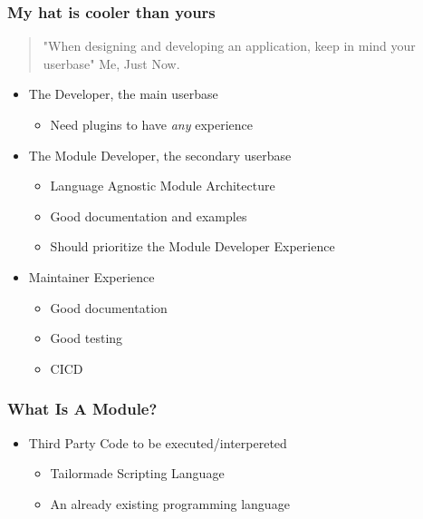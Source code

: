 \documentclass{beamer}
\begin{document}
\begin{frame}
  \frametitle{My hat is cooler than yours }
  \begin{quote}
    "When designing and developing an application, keep in mind your
    userbase" \textemdash Me, Just Now.
  \end{quote}
  \begin{itemize}
    \item The Developer, the main userbase
    \begin{itemize}
      \item Need plugins to have \textit{any} experience
    \end{itemize}
    \item The Module Developer, the secondary userbase
      \begin{itemize}
        \item Language Agnostic Module Architecture
        \item Good documentation and examples
        \item Should prioritize the Module Developer Experience
      \end{itemize}
    \item Maintainer Experience
      \begin{itemize}
        \item Good documentation
        \item Good testing
        \item CI\/CD
      \end{itemize}
  \end{itemize}
\end{frame}

\begin{frame}
  \frametitle{What Is A Module?}
  \begin{itemize}
    \item Third Party Code to be executed/interpereted
      \begin{itemize}
        \item Tailormade Scripting Language
        \item An already existing programming language
      \end{itemize}
  \end{itemize}
\end{frame}
\end{document}

